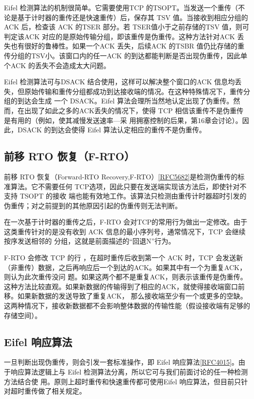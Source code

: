 Eifel 检测算法的机制很简单。它需要使用TCP 的TSOPT。当发送一个重传（不论是基于计时器的重传还是快速重传）后，保存其 TSV 值。当接收到相应分组的ACK 后，检查该
ACK 的TSER 部分。若 TSER值小于之前存储的TSV 值，则可判定该ACK 对应的是原始传输分组，即该重传是伪重传。这种方法针对ACK 丢失也有很好的鲁棒性。如果一个ACK
丢失，后续ACK 的TSBR 值仍比存储的重传分组的TSV小。该窗口内的任一ACK 的到达都能判断是否出现伪重传，因此单个ACK 的丢失不会造成太大问题。

Eifel 检测算法可与DSACK 结合使用，这样可以解决整个窗口的ACK 信息均丢失，但原始传输和重传分组都成功到达接收端的情况。在这种特殊情况下，重传分组的到达会生成
一个 DSACK。Eifel 算法会理所当然地认定出现了伪重传。然而，在出现了如此之多的ACK丢失的情况下，使得 TCP 相信该重传不是伪重传是有用的（例如，使其减慢发送速率—采
用拥塞控制的后果，第16章会讨论）。因此，DSACK 的到达会使得 Eifel 算法认定相应的重传不是伪重传。

\subsection{前移 RTO 恢复（F-RTO）}
前移 RTO 恢复（Forward-RTO Recovery,F-RTO）\href{https://www.rfc-editor.org/rfc/rfc5682}{[RFC5682]}是检测伪重传的标准算法。它不需要任何 TCP选项，因此只要在发送端实现该方法后，即使针对不支持 TSOPT 的接收
端也能有效地工作。该算法只检测由重传计时器超时引发的伪重传；对之前提到的其他原因引起的伪重传则无法判断。

在一次基于计时器的重传之后，F-RTO 会对TCP的常用行为做出一定修改。由于这类重传针对的是没有收到 ACK 信息的最小序列号，通常情况下，TCP 会继续按序发送相邻的
分组，这就是前面描述的“回退N”行为。

F-RTO 会修改 TCP 的行 ，在超时重传后收到第一个 ACK 时，TCP 会发送新（非重传）数据，之后再响应后一个到达的ACK。如果其中有一个为重复ACK，则认为此次重传没问
题。如果这两个都不是重复ACK，则表示该重传是伪重传。这种方法比较直观。如果新数据的传输得到了相应的ACK，就使得接收端窗口前移。如果新数据的发送导致了重复ACK，
那么接收端至少有一个或更多的空缺。这两种情况下，接收新数据都不会影响整体数据的传输性能（假设接收端有足够的存储空间）。

\subsection{Eifel 响应算法}
一旦判断出现伪重传，则会引发一套标准操作，即 Eifel 响应算法\href{https://www.rfc-editor.org/rfc/rfc4015}{[RFC4015]}。由于响应算法逻辑上与 Eifel 检测算法分离，所以它可与我们前面讨论的任一种检测方法结合使
用。原则上超时重传和快速重传都可使用Eifel 响应算法，但目前只针对超时重传做了相关规定。

